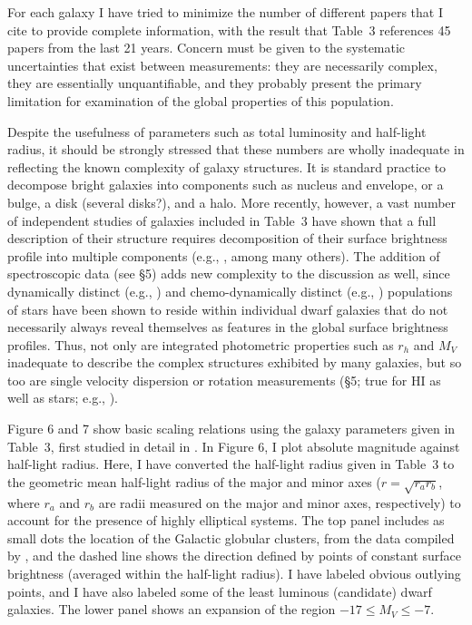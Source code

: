 \documentclass[manuscript]{aastex}
\begin{document}
For each galaxy I have tried to minimize the number of different
papers that I cite to provide complete information, with the result
that Table~3 references 45 papers from the last 21 years.  Concern
must be given to the systematic uncertainties that exist
between measurements: they are necessarily complex, they are
essentially unquantifiable, and they probably present the primary
limitation for examination of the global properties of this
population.

Despite the usefulness of parameters such as total luminosity and
half-light radius, it should be strongly stressed that these numbers
are wholly inadequate in reflecting the known complexity of galaxy
structures. It is standard practice to decompose bright galaxies into
components such as nucleus and envelope, or a bulge, a disk (several
disks?), and a halo. More recently, however, a vast number of
independent studies of galaxies included in Table~3 have shown that a
full description of their structure requires decomposition of their
surface brightness profile into multiple components (e.g.,
\citealt{irwin1995,martinezdelgado1999,lee1999b,lee1999c,lee2000,vansevicius2004,mcconnachie2007a,hidalgo2008},
among many others). The addition of spectroscopic data (see \S5) adds
new complexity to the discussion as well, since dynamically distinct
(e.g., \citealt{kleyna2003,kleyna2004}) and chemo-dynamically distinct
(e.g., \citealt{tolstoy2004,battaglia2006,battaglia2008,
  battaglia2011}) populations of stars have been shown to reside
within individual dwarf galaxies that do not necessarily always reveal
themselves as features in the global surface brightness
profiles. Thus, not only are integrated photometric properties such as
$r_h$ and $M_V$ inadequate to describe the complex structures
exhibited by many galaxies, but so too are single velocity dispersion
or rotation measurements (\S5; true for HI as well as stars; e.g.,
\citealt{lo1993,young1996,young1997a,young1997b,young2003}).

Figure 6 and 7 show basic scaling relations using the galaxy
parameters given in Table~3, first studied in detail in
\cite{kormendy1985}. In Figure 6, I plot absolute magnitude against
half-light radius. Here, I have converted the half-light radius given
in Table~3 to the geometric mean half-light radius of the major and
minor axes ($r = \sqrt{r_ar_b}$, where $r_a$ and $r_b$ are radii
measured on the major and minor axes, respectively) to account for the
presence of highly elliptical systems. The top panel includes as small
dots the location of the Galactic globular clusters, from the data
compiled by \cite{harris1996}, and the dashed line shows the direction
defined by points of constant surface brightness (averaged within the
half-light radius). I have labeled obvious outlying points, and I have
also labeled some of the least luminous (candidate) dwarf
galaxies. The lower panel shows an expansion of the region $-17 \le
M_V\le -7$.
\end{document}
